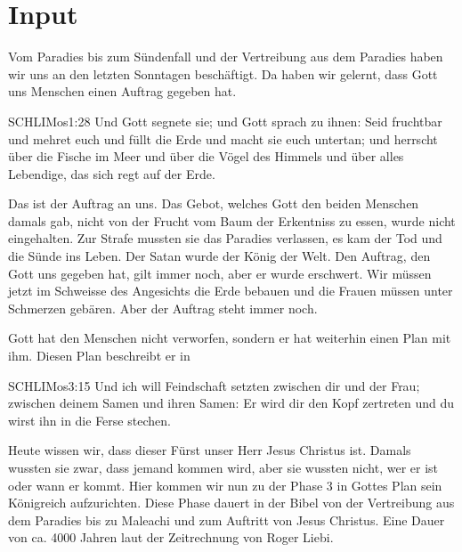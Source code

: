 \documentclass{mybib}
\begin{document}
\section{ Input }
\begin{spacing}{1.5}
    \begin{block}[Paradies]
        Vom Paradies bis zum Sündenfall und der Vertreibung aus dem Paradies haben wir uns an den letzten Sonntagen beschäftigt. Da haben wir gelernt, dass Gott uns Menschen einen Auftrag gegeben hat.
        \begin{bibelbox}{SCHL}{IMos}{1:28}
            Und Gott segnete sie; und Gott sprach zu ihnen: Seid fruchtbar und mehret euch und füllt die Erde und macht sie euch untertan; und herrscht über die Fische im Meer und über die Vögel des Himmels und über alles Lebendige, das sich regt auf der Erde.
        \end{bibelbox}
        Das ist der Auftrag an uns. Das Gebot, welches Gott den beiden Menschen damals gab, nicht von der Frucht vom Baum der Erkentniss zu essen, wurde nicht eingehalten. Zur Strafe mussten sie das Paradies verlassen, es kam der Tod und die Sünde ins Leben. Der Satan wurde der König der Welt. Den Auftrag, den Gott uns gegeben hat, gilt immer noch, aber er wurde erschwert. Wir müssen jetzt im Schweisse des Angesichts die Erde bebauen und die Frauen müssen unter Schmerzen gebären. Aber der Auftrag steht immer noch.

        Gott hat den Menschen nicht verworfen, sondern er hat weiterhin einen Plan mit ihm. Diesen Plan beschreibt er in 
        \begin{bibelbox}{SCHL}{IMos}{3:15}
            Und ich will Feindschaft setzten zwischen dir und der Frau; zwischen deinem Samen und ihren Samen: Er wird dir den Kopf zertreten und du wirst ihn in die Ferse stechen.
        \end{bibelbox}
        Heute wissen wir, dass dieser Fürst unser Herr Jesus Christus ist. Damals wussten sie zwar, dass jemand kommen wird, aber sie wussten nicht, wer er ist oder wann er kommt.
        Hier kommen wir nun zu der Phase 3 in Gottes Plan sein Königreich aufzurichten. Diese Phase dauert in der Bibel von der Vertreibung aus dem Paradies bis zu Maleachi und zum Auftritt von Jesus Christus. Eine Dauer von ca. 4000 Jahren laut der Zeitrechnung von Roger Liebi.


\end{block}
\end{spacing}
\end{document}
